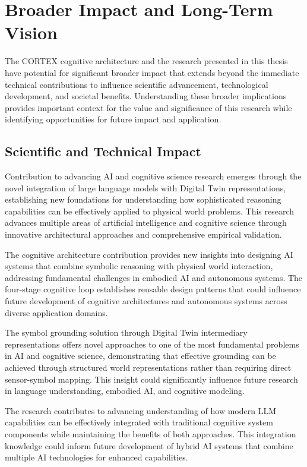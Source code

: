 \section{Broader Impact and Long-Term Vision}

The CORTEX cognitive architecture and the research presented in this thesis have potential for significant broader impact that extends beyond the immediate technical contributions to influence scientific advancement, technological development, and societal benefits. Understanding these broader implications provides important context for the value and significance of this research while identifying opportunities for future impact and application.

\subsection{Scientific and Technical Impact}

Contribution to advancing AI and cognitive science research emerges through the novel integration of large language models with Digital Twin representations, establishing new foundations for understanding how sophisticated reasoning capabilities can be effectively applied to physical world problems. This research advances multiple areas of artificial intelligence and cognitive science through innovative architectural approaches and comprehensive empirical validation.

The cognitive architecture contribution provides new insights into designing AI systems that combine symbolic reasoning with physical world interaction, addressing fundamental challenges in embodied AI and autonomous systems. The four-stage cognitive loop establishes reusable design patterns that could influence future development of cognitive architectures and autonomous systems across diverse application domains.

The symbol grounding solution through Digital Twin intermediary representations offers novel approaches to one of the most fundamental problems in AI and cognitive science, demonstrating that effective grounding can be achieved through structured world representations rather than requiring direct sensor-symbol mapping. This insight could significantly influence future research in language understanding, embodied AI, and cognitive modeling.

The research contributes to advancing understanding of how modern LLM capabilities can be effectively integrated with traditional cognitive system components while maintaining the benefits of both approaches. This integration knowledge could inform future development of hybrid AI systems that combine multiple AI technologies for enhanced capabilities.

